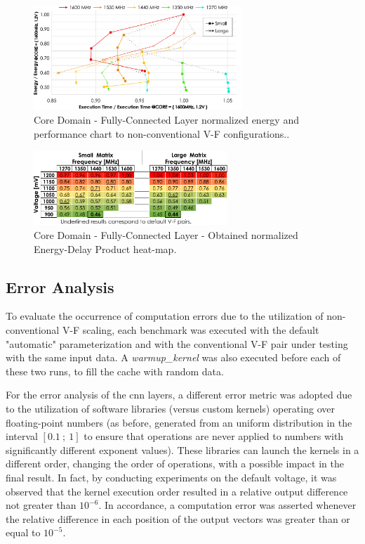 \begin{figure}[htbp]
    \centering
        \includegraphics[width=0.7\textwidth]{Figures/Application To Deep Learning/MatrixMul_behaviour.pdf}
        \caption{Core Domain - Fully-Connected Layer normalized energy and performance chart to non-conventional V-F configurations..}
    \label{fig:MatrixMult_behaviour}
\end{figure}





\begin{figure}[htbp]
    \centering
        \includegraphics[width=0.65\textwidth]{Figures/Application To Deep Learning/MatrixMul_EDP.pdf}
        \caption{Core Domain - Fully-Connected Layer - Obtained normalized Energy-Delay Product heat-map.}
    \label{fig:MatrixMult_EDP}
\end{figure}

\subsection{Error Analysis}

To evaluate the occurrence of computation errors due to the utilization of non-conventional V-F scaling, each benchmark was executed with the default "automatic" parameterization and with the conventional V-F pair under testing with the same input data. A \textit{warmup\_kernel} was also executed before each of these two runs, to fill the cache with random data. 


For the error analysis of the \acrshort{cnn} layers, a different error metric was adopted due to the utilization of software libraries (versus custom kernels) operating over floating-point numbers (as before, generated from an uniform distribution in the interval $[0.1~;~1]$ to ensure that operations are never applied to numbers with significantly different exponent values). These libraries can launch the kernels in a different order, changing the order of operations, with a possible impact in the final result. In fact, by conducting experiments on the default voltage, it was observed that the kernel execution order resulted in a relative output difference not greater than $10^{-6}$. In accordance, a computation error was asserted whenever the relative difference in each position of the output vectors was greater than or equal to  $10^{-5}$.

